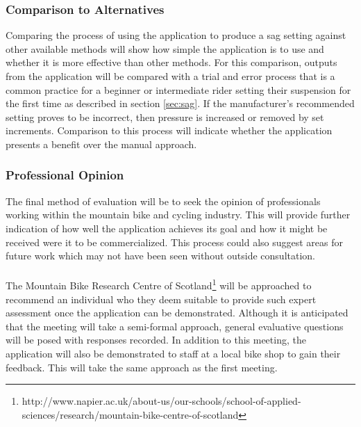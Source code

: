 		\subsubsection{Comparison to Alternatives}\label{sec:methodology_manual}
			Comparing the process of using the application to produce a sag setting against other available methods will show how simple the application is to use and whether it is more effective than other methods. For this comparison, outputs from the application will be compared with a trial and error process that is a common practice for a beginner or intermediate rider setting their suspension for the first time as described in section \ref{sec:sag}. If the manufacturer's recommended setting proves to be incorrect, then pressure is increased or removed by set increments. Comparison to this process will indicate whether the application presents a benefit over the manual approach.
		\subsubsection{Professional Opinion}\label{sec:methodology_professional_opinion}
			The final method of evaluation will be to seek the opinion of professionals working within the mountain bike and cycling industry. This will provide further indication of how well the application achieves its goal and how it might be received were it to be commercialized. This process could also suggest areas for future work which may not have been seen without outside consultation.
			\\\\
			The Mountain Bike Research Centre of Scotland\footnote{http://www.napier.ac.uk/about-us/our-schools/school-of-applied-sciences/research/mountain-bike-centre-of-scotland} will be approached to recommend an individual who they deem suitable to provide such expert assessment once the application can be demonstrated. Although it is anticipated that the meeting will take a semi-formal approach, general evaluative questions will be posed with responses recorded. In addition to this meeting, the application will also be demonstrated to staff at a local bike shop to gain their feedback. This will take the same approach as the first meeting.
			